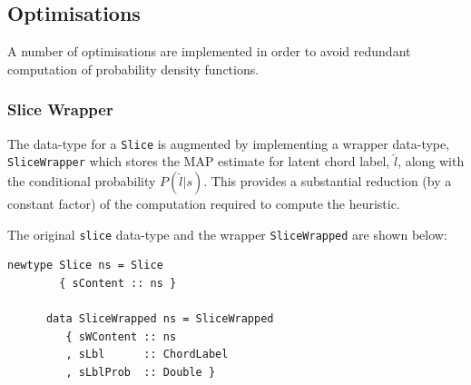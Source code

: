 \documentclass[12pt,a4paper,twoside,openany]{report} \usepackage[pdfborder={0 0 0}]{hyperref}    %
\theoremstyle{definition} \newtheorem{definition}{Definition}[section]
\begin{document}

    \subsection{Optimisations}
    \label{sub:optimisations}

    A number of optimisations are implemented in order to avoid redundant computation of probability density functions.

    \subsubsection{Slice Wrapper}

    The data-type for a \texttt{Slice} is augmented by implementing a wrapper data-type, \texttt{SliceWrapper} which
    stores the MAP estimate for latent chord label, $\hat{l}$, along with the conditional probability $P(\hat{l}|s)$. 
    This provides a substantial reduction (by a constant factor) of the computation required to compute the heuristic.

    The original \texttt{slice} data-type and the wrapper \texttt{SliceWrapped} are shown below:

    \begin{lstlisting}[caption={Slice Wrapper}, captionpos=b] 
      newtype Slice ns = Slice
        { sContent :: ns }

      data SliceWrapped ns = SliceWrapped
         { sWContent :: ns
         , sLbl      :: ChordLabel
         , sLblProb  :: Double }
    \end{lstlisting}
\end{document}
